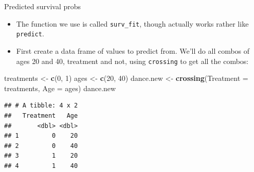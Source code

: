 \documentclass[ignorenonframetext,]{beamer}
\newenvironment{Shaded}{\begin{snugshade}}{\end{snugshade}}
\newcommand{\DataTypeTok}[1]{\textcolor[rgb]{0.13,0.29,0.53}{#1}}
\newcommand{\DecValTok}[1]{\textcolor[rgb]{0.00,0.00,0.81}{#1}}
\newcommand{\KeywordTok}[1]{\textcolor[rgb]{0.13,0.29,0.53}{\textbf{#1}}}
\newcommand{\NormalTok}[1]{#1}
\newcommand{\StringTok}[1]{\textcolor[rgb]{0.31,0.60,0.02}{#1}}
\providecommand{\tightlist}{%
  \setlength{\itemsep}{0pt}\setlength{\parskip}{0pt}}
\begin{document}
\begin{frame}[fragile]{Predicted survival probs}
\protect\hypertarget{predicted-survival-probs-1}{}

\begin{itemize}
\tightlist
\item
  The function we use is called \texttt{surv\_fit}, though actually
  works rather like \texttt{predict}.
\item
  First create a data frame of values to predict from. We'll do all
  combos of ages 20 and 40, treatment and not, using \texttt{crossing}
  to get all the combos:
\end{itemize}

\small

\begin{Shaded}
\begin{Highlighting}[]
\NormalTok{treatments <-}\StringTok{ }\KeywordTok{c}\NormalTok{(}\DecValTok{0}\NormalTok{, }\DecValTok{1}\NormalTok{)}
\NormalTok{ages <-}\StringTok{ }\KeywordTok{c}\NormalTok{(}\DecValTok{20}\NormalTok{, }\DecValTok{40}\NormalTok{)}
\NormalTok{dance.new <-}\StringTok{ }\KeywordTok{crossing}\NormalTok{(}\DataTypeTok{Treatment =}\NormalTok{ treatments, }\DataTypeTok{Age =}\NormalTok{ ages)}
\NormalTok{dance.new}
\end{Highlighting}
\end{Shaded}

\begin{verbatim}
## # A tibble: 4 x 2
##   Treatment   Age
##       <dbl> <dbl>
## 1         0    20
## 2         0    40
## 3         1    20
## 4         1    40
\end{verbatim}

\normalsize

\end{frame}
\end{document}
